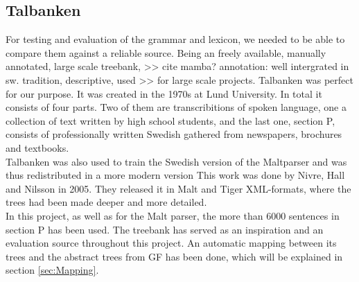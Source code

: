 \documentclass{report}
\begin{document}
%
%


\subsection{Talbanken}
For testing and evaluation of the grammar and lexicon, we needed to be able to
compare them against a reliable source.
Being an freely available, manually annotated, large scale treebank,
>> cite mamba? annotation: well intergrated in sw. tradition, descriptive, used
>> for large scale projects.
Talbanken\cite{talbanken} was perfect for our purpose.
It was created in the 1970s at Lund University. In total it consists of four
parts. Two of them are transcribitions of spoken language, one a collection of
text written by high school students, and the last one, section P,
consists of professionally written Swedish gathered from newspapers, brochures and textbooks.\\
Talbanken was also used to train the Swedish version of the Maltparser\cite{malt}
and was thus redistributed in a more modern version\cite{talbanken05} This work
was done by Nivre, Hall and Nilsson in 2005. They released it in Malt and Tiger XML-formats,
where the trees had been made deeper and more detailed. \\
In this project, as well as for the Malt parser, the more than 6000 sentences
in section P has been used.
The treebank has served as an inspiration and an evaluation source throughout this
project. An automatic mapping between its trees and the abstract trees from GF has been
done, which will be explained in section \ref{sec:Mapping}.
\end{document}
